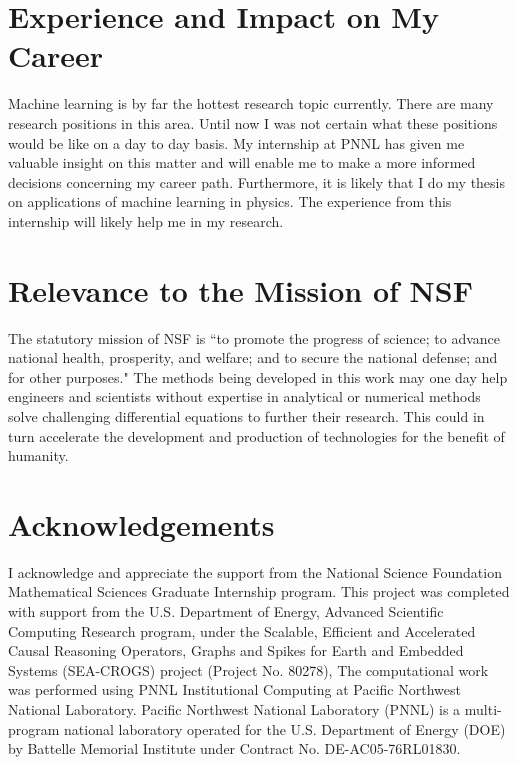\documentclass[12pt]{article}
\begin{document}
\section{Experience and Impact on My Career}
Machine learning is by far the hottest research topic currently. There are many research positions in this area. Until now I was not certain what these positions would be like on a day to day basis. My internship at PNNL has given me valuable insight on this matter and will enable me to make a more informed decisions concerning my career path. Furthermore, it is likely that I do my thesis on applications of machine learning in physics. The experience from this internship will likely help me in my research.

\section{Relevance to the Mission of NSF}
The statutory mission of NSF is ``to promote the progress of science; to advance national health, prosperity, and welfare; and to secure the national defense; and for other purposes." The methods being developed in this work may one day help engineers and scientists without expertise in analytical or numerical methods solve challenging differential equations to further their research. This could in turn accelerate the development and production of technologies for the benefit of humanity.

\section{Acknowledgements}
I acknowledge and appreciate the support from the National Science Foundation Mathematical Sciences Graduate Internship program. This project was completed with support from the U.S. Department of Energy, Advanced Scientific Computing Research program, under the Scalable, Efficient and Accelerated Causal Reasoning Operators, Graphs and Spikes for Earth and Embedded Systems (SEA-CROGS) project (Project No. 80278), The computational work was performed using PNNL Institutional Computing at Pacific Northwest National Laboratory. Pacific Northwest National Laboratory (PNNL) is a multi-program national laboratory operated for the U.S. Department of Energy (DOE) by Battelle Memorial Institute under Contract No. DE-AC05-76RL01830.
\pagebreak


\end{document}
